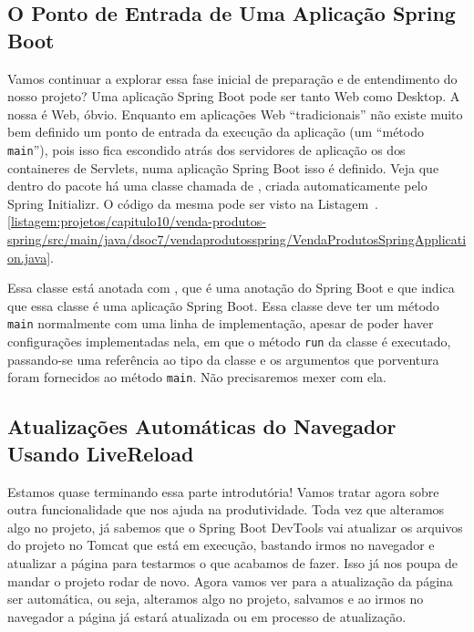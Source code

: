 \subsection{O Ponto de Entrada de Uma Aplicação Spring Boot}

Vamos continuar a explorar essa fase inicial de preparação e de entendimento do nosso projeto? Uma aplicação Spring Boot pode ser tanto Web como Desktop. A nossa é Web, óbvio. Enquanto em aplicações Web ``tradicionais'' não existe muito bem definido um ponto de entrada da execução da aplicação (um ``método \texttt{main}''), pois isso fica escondido atrás dos servidores de aplicação os dos containeres de Servlets, numa aplicação Spring Boot isso é definido. Veja que dentro do pacote  há uma classe chamada de , criada automaticamente pelo Spring Initializr. O código da mesma pode ser visto na Listagem~\thechapter.\ref{listagem:projetos/capitulo10/venda-produtos-spring/src/main/java/dsoc7/vendaprodutosspring/VendaProdutosSpringApplication.java}.


Essa classe está anotada com , que é uma anotação do Spring Boot e que indica que essa classe é uma aplicação Spring Boot. Essa classe deve ter um método \texttt{main} normalmente com uma linha de implementação, apesar de poder haver configurações implementadas nela, em que o método \texttt{run} da classe  é executado, passando-se uma referência ao tipo da classe  e os argumentos que porventura foram fornecidos ao método \texttt{main}. Não precisaremos mexer com ela.


\subsection{Atualizações Automáticas do Navegador Usando LiveReload}

Estamos quase terminando essa parte introdutória! Vamos tratar agora sobre outra funcionalidade que nos ajuda na produtividade. Toda vez que alteramos algo no projeto, já sabemos que o Spring Boot DevTools vai atualizar os arquivos do projeto no Tomcat que está em execução, bastando irmos no navegador e atualizar a página para testarmos o que acabamos de fazer. Isso já nos poupa de mandar o projeto rodar de novo. Agora vamos ver para a atualização da página ser automática, ou seja, alteramos algo no projeto, salvamos e ao irmos no navegador a página já estará atualizada ou em processo de atualização.

